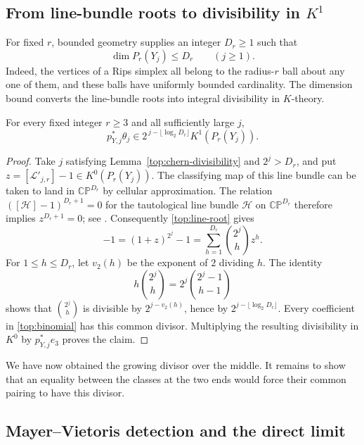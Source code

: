 \subsection{From line-bundle roots to divisibility in \texorpdfstring{$K^1$}{K1}}

For fixed $r$, bounded geometry supplies an integer $D_r\geq1$ such
that
\[
 \dim P_r(Y_j)\leq D_r\qquad(j\geq1).
\]
Indeed, the vertices of a Rips simplex all belong to the radius-$r$
ball about any one of them, and these balls have uniformly bounded
cardinality. The dimension bound converts the line-bundle roots into
integral divisibility in $K$-theory.

\begin{lemma}
\label{top:k-divisibility}
For every fixed integer $r\geq3$ and all sufficiently large $j$,
\begin{equation}
 p_{Y,j}^*\theta_j\in
 2^{\,j-\lfloor\log_2D_r\rfloor}K^1(P_r(Y_j)).
 \label{top:k-divisibility-eq}
\end{equation}
\end{lemma}

\begin{proof}
Take $j$ satisfying Lemma~\ref{top:chern-divisibility} and $2^j>D_r$,
and put
$z=[\mathcal L'_{j,r}]-1\in K^0(P_r(Y_j))$.
The classifying map of this line bundle can be taken to land in
$\mathbb{CP}^{D_r}$ by cellular approximation. The relation
$([\mathcal H]-1)^{D_r+1}=0$ for the tautological line bundle
$\mathcal H$ on $\mathbb{CP}^{D_r}$ therefore implies
$z^{D_r+1}=0$; see \cite[Corollary 2.7.9]{Atiyah67}.
Consequently \eqref{top:line-root} gives
\begin{equation}
 [p_{Y,j}^*\mathcal L_j]-1
 =(1+z)^{2^j}-1
 =\sum_{h=1}^{D_r}\binom{2^j}{h}z^h.
 \label{top:binomial}
\end{equation}
For $1\leq h\leq D_r$, let $v_2(h)$ be the exponent of $2$ dividing
$h$. The identity
\[
 h\binom{2^j}{h}=2^j\binom{2^j-1}{h-1}
\]
shows that $\binom{2^j}{h}$ is divisible by
$2^{j-v_2(h)}$, hence by
$2^{j-\lfloor\log_2D_r\rfloor}$. Every coefficient in
\eqref{top:binomial} has this common divisor. Multiplying the
resulting divisibility in $K^0$ by $p_{Y,j}^*e_3$ proves the claim.
\end{proof}

We have now obtained the growing divisor over the middle. It remains
to show that an equality between the classes at the two ends would
force their common pairing to have this divisor.

\subsection{Mayer--Vietoris detection and the direct limit}

